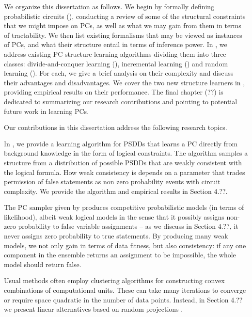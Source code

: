 We organize this dissertation as follows. We begin  by formally defining probabilistic
circuits (), conducting a review of some of the structural constraints that we might
impose on PCs, as well as what we may gain from them in terms of tractability.
We then list existing formalisms that may be viewed as instances of PCs, and what their structure
entail in terms of inference power. In , we address existing PC structure
learning algorithms dividing them into three classes: divide-and-conquer learning
(), incremental learning () and random learning
(). For each, we give a brief analysis on their complexity and discuss their
advantages and disadvantages. We cover the two new structure learners in ,
providing empirical results on their performance. The final chapter (??) is dedicated to
summarizing our research contributions and pointing to potential future work in learning PCs.

Our contributions in this dissertation address the following research topics.


In \citet{geh21a}, we provide a learning algorithm for PSDDs that learns a PC directly from
background knowledge in the form of logical constraints. The algorithm samples a structure from a
distribution of possible PSDDs that are weakly consistent with the logical formula. How weak
consistency is depends on a parameter that trades permission of false statements as non zero
probability events with circuit complexity. We provide the algorithm and empirical results in
Section 4.??.


The PC sampler given by \citet{geh21a} produces competitive probabilistic models (in terms of
likelihood), albeit weak logical models in the sense that it possibly assigns non-zero probability
to false variable assignments -- as we discuss in Section 4.??, it never assigns zero probability
to true statements. By producing many weak models, we not only gain in terms of data fitness, but
also consistency: if any one component in the ensemble returns an assignment to be impossible, the
whole model should return false.


Usual methods often employ clustering algorithms for constructing convex combinations of
computational units. These can take many iterations to converge or require space quadratic in the
number of data points. Instead, in Section 4.?? we present linear alternatives based on random
projections \citep{dasgupta08a,dasgupta08b}.

